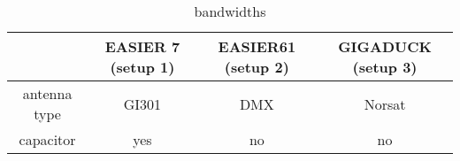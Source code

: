 \begin{table}[h!]                                                                    
  \centering                                                                         
  \caption{bandwidths}                                                               
  \label{tab:easierdetectors}  
  \begin{tabular}{|c||c|c|c|}                                                        
    \hline                                                                           
    & EASIER 7 (setup 1)  & EASIER61 (setup 2) & GIGADUCK (setup 3) \\                                          
    \hline                                                                           
    antenna type & GI301  & DMX & Norsat \\                                          
    \hline                                                                           
    capacitor & yes  & no & no \\     
    \hline                                                                           
  \end{tabular}                                                                      
\end{table} 


